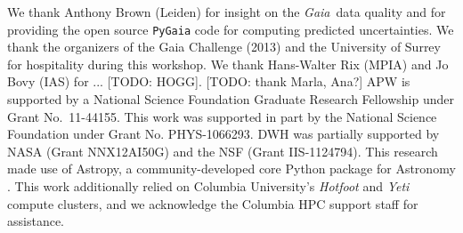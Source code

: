 \documentclass[letterpaper,12pt,preprint]{aastex}
\newcommand{\project}[1]{\textsl{#1}}
\newcommand{\gaia}{\project{Gaia}}
\begin{document}
\acknowledgements
We thank Anthony Brown (Leiden) for insight on the \gaia\, data quality and for providing the open source \texttt{PyGaia} code for computing predicted uncertainties. We thank the organizers of the Gaia Challenge (2013) and the University of Surrey for hospitality during this workshop. We thank Hans-Walter Rix (MPIA) and Jo Bovy (IAS) for ... [TODO: HOGG].
[TODO: thank Marla, Ana?]
APW is supported by a National Science Foundation Graduate Research Fellowship under Grant No.\ 11-44155. This work was supported in part by the National Science Foundation under Grant No. PHYS-1066293. 
DWH was partially supported by NASA (Grant NNX12AI50G) and the NSF (Grant IIS-1124794).
This research made use of Astropy, a community-developed core Python package for Astronomy \citep{astropy13}.
This work additionally relied on Columbia University's \emph{Hotfoot} and \emph{Yeti} compute clusters, and we acknowledge the Columbia HPC support staff for assistance. \\



\end{document}
